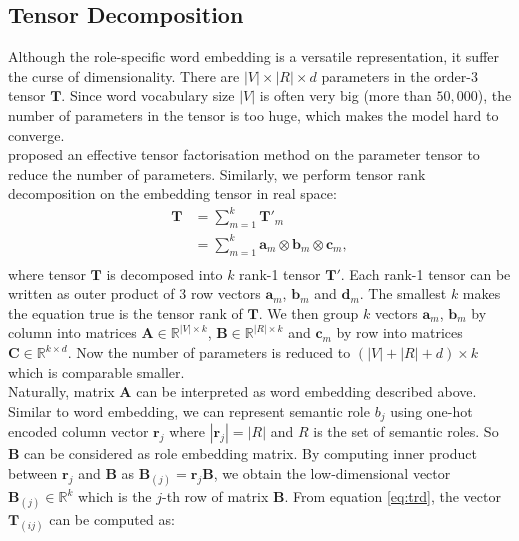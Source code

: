 \documentclass[a4paper]{article}
\begin{document}
\subsection{Tensor Decomposition}
Although the role-specific word embedding is a versatile representation, it suffer the curse of dimensionality. There are $|V| \times |R| \times d$ parameters in the order-3 tensor $\mathbf{T}$. Since word vocabulary size $|V|$ is often very big (more than $50,000$), the number of parameters in the tensor is too huge, which makes the model hard to converge.  \\
\noindent
\citet{tilk2016event} proposed an effective tensor factorisation method on the parameter tensor to reduce the number of parameters. Similarly, we perform tensor rank decomposition \citep{hitchcock1927expression} on the embedding tensor in real space:
\begin{equation} \label{eq:trd}
\begin{aligned}
    \mathbf{T}   
        &= \sum_{m=1}^{k} \mathbf{T}'_m \\
        &= \sum_{m=1}^{k} \mathbf{a}_m \otimes \mathbf{b}_m \otimes \mathbf{c}_m, \\
\end{aligned}
\end{equation}
where tensor $\mathbf{T}$ is decomposed into $k$ rank-1 tensor $\mathbf{T}'$. Each rank-1 tensor can be written as outer product of 3 row vectors $\mathbf{a}_m$, $\mathbf{b}_m$ and $\mathbf{d}_m$. The smallest $k$ makes the equation true is the tensor rank of $\mathbf{T}$. We then group $k$ vectors $\mathbf{a}_m$, $\mathbf{b}_m$ by column into matrices $\mathbf{A} \in \mathbb{R}^{|V| \times k}$, $\mathbf{B} \in \mathbb{R}^{|R| \times k}$ and $\mathbf{c}_m$ by row into matrices $\mathbf{C} \in \mathbb{R}^{k \times d}$. Now the number of parameters is reduced to $(|V| + |R| + d) \times k$ which is comparable smaller. \\
\noindent
Naturally, matrix $\mathbf{A}$ can be interpreted as word embedding described above. Similar to word embedding, we can represent semantic role $b_j$ using one-hot encoded column vector $\mathbf{r}_j$ where $|\mathbf{r}_j| = |R|$ and $R$ is the set of semantic roles. So $\mathbf{B}$ can be considered as role embedding matrix. By computing inner product between $\mathbf{r}_j$ and $\mathbf{B}$ as $\mathbf{B}_{(j)} = \mathbf{r}_j \mathbf{B}$, we obtain the low-dimensional vector $\mathbf{B}_{(j)} \in \mathbb{R}^k$ which is the $j$-th row of matrix $\mathbf{B}$. From equation \eqref{eq:trd}, the vector $\mathbf{T}_{(ij)}$ can be computed as: 
\end{document}
